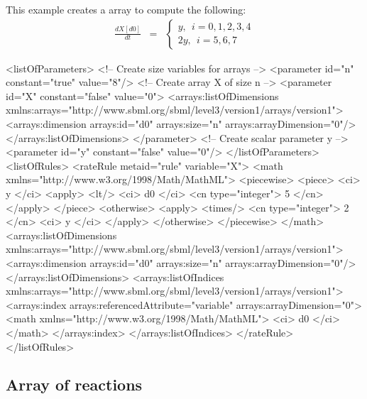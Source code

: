 This example creates a \RateRule array to compute the following:
\begin{eqnarray*}
\frac{dX[d0]}{dt} & = & \left\{ \begin{array}{l}
  y,~~i = 0, 1, 2, 3, 4 \\
 2y,~~i = 5, 6, 7 
\end{array}
\right.
\end{eqnarray*}
\begin{example}
<listOfParameters>
    <!-- Create size variables for arrays -->
    <parameter id="n" constant="true" value="8"/>
    <!-- Create array X of size n -->
    <parameter id="X" constant="false" value="0">
        <arrays:listOfDimensions
            xmlns:arrays="http://www.sbml.org/sbml/level3/version1/arrays/version1">
            <arrays:dimension arrays:id="d0" arrays:size="n" arrays:arrayDimension="0"/>
        </arrays:listOfDimensions>
    </parameter>
    <!-- Create scalar parameter y -->
    <parameter id="y" constant="false" value="0"/>
</listOfParameters>
<listOfRules>
    <rateRule metaid="rule" variable="X">
        <math xmlns="http://www.w3.org/1998/Math/MathML">
            <piecewise>
                <piece>
                    <ci> y </ci>
                    <apply>
                        <lt/>
                        <ci> d0 </ci>
                        <cn type="integer"> 5 </cn>
                    </apply>
                </piece>
                <otherwise>
                    <apply>
                        <times/>
                        <cn type="integer"> 2 </cn>
                        <ci> y </ci>
                    </apply>
                </otherwise>
            </piecewise>
        </math>
        <arrays:listOfDimensions
            xmlns:arrays="http://www.sbml.org/sbml/level3/version1/arrays/version1">
            <arrays:dimension arrays:id="d0" arrays:size="n" arrays:arrayDimension="0"/>
        </arrays:listOfDimensions>
        <arrays:listOfIndices
            xmlns:arrays="http://www.sbml.org/sbml/level3/version1/arrays/version1">
            <arrays:index arrays:referencedAttribute="variable" arrays:arrayDimension="0">
                <math xmlns="http://www.w3.org/1998/Math/MathML">
                    <ci> d0 </ci>
                </math>
            </arrays:index>
        </arrays:listOfIndices>
    </rateRule>
</listOfRules>
\end{example}

\subsection{Array of reactions}

